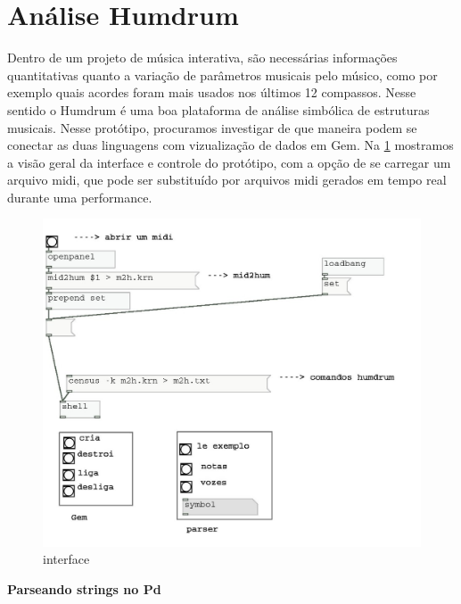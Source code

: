 \documentclass{ppgmus}
\begin{document}
\pagebreak 



\section{Análise Humdrum}

  Dentro de um projeto de música interativa, são necessárias informações quantitativas quanto a 
variação de parâmetros musicais pelo músico, como por exemplo quais acordes foram mais usados 
nos últimos 12 compassos.
Nesse sentido o Humdrum é uma boa plataforma de análise simbólica de estruturas musicais. 
Nesse protótipo, procuramos investigar de que maneira podem se conectar as duas linguagens 
com vizualização de dados em Gem.
Na \ref{interface} mostramos a visão geral da interface e controle
do protótipo, com a opção de se carregar um arquivo midi, 
que pode ser substituído por arquivos midi gerados em tempo real 
durante uma performance.




\begin{figure}
\includegraphics[scale=.7]{interface00}
\caption{interface}
\label{interface}
\end{figure} 

\textbf{Parseando strings no Pd}
\end{document}
